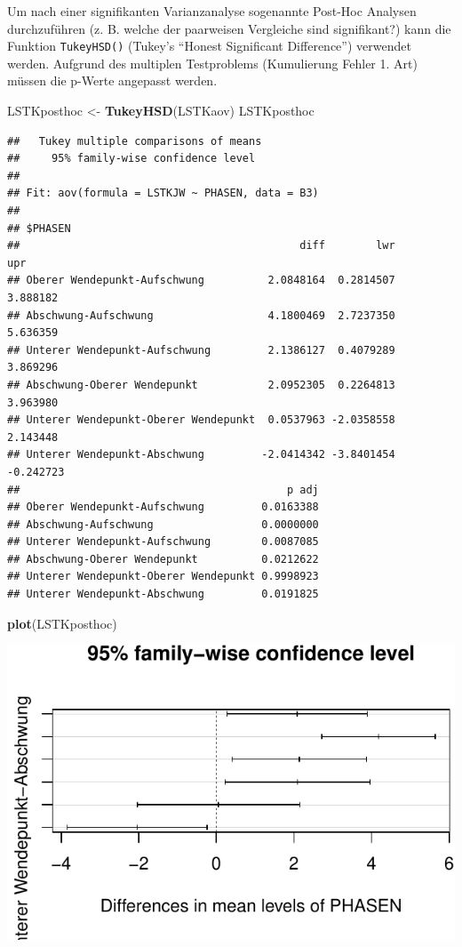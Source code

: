 \documentclass[12pt,ngerman,paper=a4,pagesize,DIV=13]{scrreprt}
\newenvironment{Shaded}{\begin{snugshade}}{\end{snugshade}}
\newcommand{\KeywordTok}[1]{\textcolor[rgb]{0.13,0.29,0.53}{\textbf{#1}}}
\newcommand{\NormalTok}[1]{#1}
\newcommand{\StringTok}[1]{\textcolor[rgb]{0.31,0.60,0.02}{#1}}
\begin{document}
Um nach einer signifikanten Varianzanalyse sogenannte Post-Hoc Analysen
durchzuführen (z. B. welche der paarweisen Vergleiche sind signifikant?)
kann die Funktion \texttt{TukeyHSD()} (Tukey's \enquote{Honest
Significant Difference}) verwendet werden. Aufgrund des multiplen
Testproblems (Kumulierung Fehler 1. Art) müssen die p-Werte angepasst
werden.

\begin{Shaded}
\begin{Highlighting}[]
\NormalTok{LSTKposthoc <-}\StringTok{ }\KeywordTok{TukeyHSD}\NormalTok{(LSTKaov)}
\NormalTok{LSTKposthoc}
\end{Highlighting}
\end{Shaded}

\begin{verbatim}
##   Tukey multiple comparisons of means
##     95% family-wise confidence level
## 
## Fit: aov(formula = LSTKJW ~ PHASEN, data = B3)
## 
## $PHASEN
##                                            diff        lwr       upr
## Oberer Wendepunkt-Aufschwung          2.0848164  0.2814507  3.888182
## Abschwung-Aufschwung                  4.1800469  2.7237350  5.636359
## Unterer Wendepunkt-Aufschwung         2.1386127  0.4079289  3.869296
## Abschwung-Oberer Wendepunkt           2.0952305  0.2264813  3.963980
## Unterer Wendepunkt-Oberer Wendepunkt  0.0537963 -2.0358558  2.143448
## Unterer Wendepunkt-Abschwung         -2.0414342 -3.8401454 -0.242723
##                                          p adj
## Oberer Wendepunkt-Aufschwung         0.0163388
## Abschwung-Aufschwung                 0.0000000
## Unterer Wendepunkt-Aufschwung        0.0087085
## Abschwung-Oberer Wendepunkt          0.0212622
## Unterer Wendepunkt-Oberer Wendepunkt 0.9998923
## Unterer Wendepunkt-Abschwung         0.0191825
\end{verbatim}

\begin{Shaded}
\begin{Highlighting}[]
\KeywordTok{plot}\NormalTok{(LSTKposthoc)}
\end{Highlighting}
\end{Shaded}

\includegraphics{DatenerhebungStatistik-Uebung_files/figure-latex/unnamed-chunk-152-1.pdf}
\end{document}
